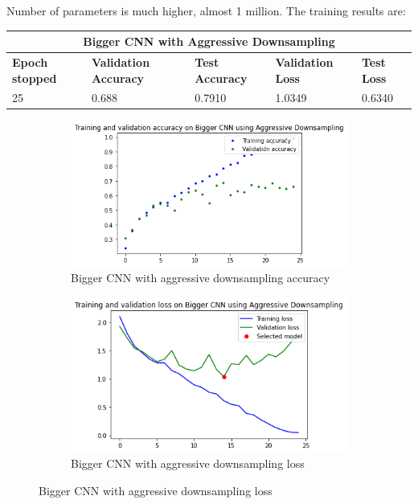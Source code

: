 \noindent Number of parameters is much higher, almost 1 million. The training results are: 

\medskip

\begin{tabular}{ |p{2cm}|p{2cm}|p{2cm}|p{2cm}|p{2cm}|  }
\hline
\multicolumn{5}{|c|}{Bigger CNN with Aggressive Downsampling} \\
\hline
\textbf{Epoch stopped} & \textbf{Validation Accuracy} & \textbf{Test Accuracy} & \textbf{Validation Loss} & \textbf{Test Loss} \\
\hline
25 & 0.688 & 0.7910 & 1.0349 & 0.6340\\
\hline
\end{tabular}

\medskip


\begin{figure}[H]
	\begin{subfigure}{0.5\textwidth}
		\includegraphics[width=0.9\linewidth]{img/scratch/bigger_ad_acc.png} 
		\caption{Bigger CNN with aggressive downsampling accuracy}
		\label{fig:BiggerAggressiveDownsamplingacc}
	\end{subfigure}
	\begin{subfigure}{0.5\textwidth}
		\includegraphics[width=0.9\linewidth]{img/scratch/bigger_ad_loss.png}
		\caption{Bigger CNN with aggressive downsampling loss}
		\label{fig:BiggerAggressiveDownsamplingloss}
	\end{subfigure}
\end{figure}


